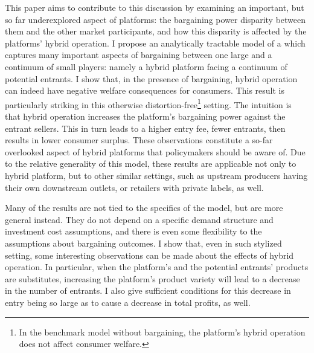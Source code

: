 \documentclass[a4paper]{article}
\begin{document}
This paper aims to contribute to this discussion by examining an important, but so far underexplored aspect of platforms: the bargaining power disparity between them and the other market participants, and how this disparity is affected by the platforms' hybrid operation.
I propose an analytically tractable model of a which captures many important aspects of bargaining between one large and a continuum of small players: namely a hybrid platform facing a continuum of potential entrants.
I show that, in the presence of bargaining, hybrid operation can indeed have negative welfare consequences for consumers.
This result is particularly striking in this otherwise distortion-free\footnote{
    In the benchmark model without bargaining, the platform's hybrid operation does not affect consumer welfare.
} setting. 
The intuition is that hybrid operation increases the platform's bargaining power against the entrant sellers.
This in turn leads to a higher entry fee, fewer entrants, then results in lower consumer surplus.
These observations constitute a so-far overlooked aspect of hybrid platforms that policymakers should be aware of.
Due to the relative generality of this model, these results are applicable not only to hybrid platform, but to other similar settings, such as upstream producers having their own downstream outlets, or retailers with private labels, as well.

Many of the results are not tied to the specifics of the model, but are more general instead.
They do not depend on a specific demand structure and investment cost assumptions, and there is even some flexibility to the assumptions about bargaining outcomes.
I show that, even in such stylized setting, some interesting observations can be made about the effects of hybrid operation. 
In particular, when the platform's and the potential entrants' products are substitutes, increasing the platform's product variety will lead to a decrease in the number of entrants.
I also give sufficient conditions for this decrease in entry being so large as to cause a decrease in total profits, as well.
\end{document}
